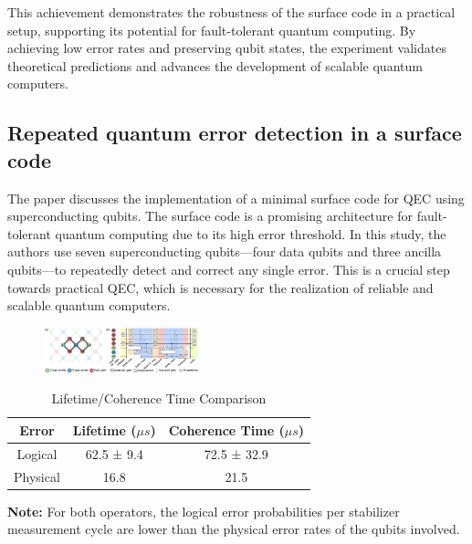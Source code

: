 This achievement demonstrates the robustness of the surface code in a practical setup, supporting its potential for fault-tolerant quantum computing. By achieving low error rates and preserving qubit states, the experiment validates theoretical predictions and advances the development of scalable quantum computers.

\subsection{Repeated quantum error detection in a surface code}

The paper discusses the implementation of a minimal surface code for QEC using superconducting qubits. The surface code is a promising architecture for fault-tolerant quantum computing due to its high error threshold. In this study, the authors use seven superconducting qubits—four data qubits and three ancilla qubits—to repeatedly detect and correct any single error. This is a crucial step towards practical QEC, which is necessary for the realization of reliable and scalable quantum computers.

\begin{figure}[h]
    \centering
    \includegraphics[width=0.4\textwidth]{sections/5_practical_implementation/7_qubits.jpg}
    \caption{}
\end{figure}

\begin{table}[h]
    \centering
    \caption{Lifetime/Coherence Time Comparison}
    \begin{center}
        \begin{tabular}{|c|c|c|}
            \hline
            \textbf{Error} & \textbf{Lifetime ($\mu s$)} & \textbf{Coherence Time ($\mu s$)} \\
            \hline
            Logical        & 62.5 ± 9.4                & 72.5 ± 32.9 \\
            Physical       & 16.8                      & 21.5        \\
            \hline
        \end{tabular}
    \end{center}
    \begin{tablenotes}
        \small
        \item \textbf{Note:} For both operators, the logical error probabilities per stabilizer measurement cycle are lower than the physical error rates of the qubits involved.
    \end{tablenotes}
\end{table}

